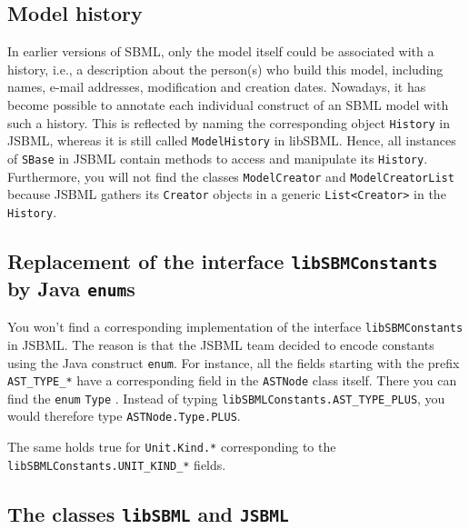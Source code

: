 \documentclass[
  BCOR12mm,
  letterpaper,
  11pt,
  headsepline,
  pointlessnumbers,
  tablecaptionabove,
  onelinecaption,
  headinclude,
  appendixprefix,
  idxtotoc,
  bibtotoc,
  twoside,
  titlepage
]{scrartcl}
\begin{document}
\subsection{Model history}

In earlier versions of SBML, only the model itself could be
associated with a history, i.e., a description about the person(s) who build
this model, including names, e-mail addresses, modification and creation dates.
Nowadays, it has become possible to annotate each individual construct of an
SBML model with such a history. This is reflected by naming the corresponding
object \texttt{History}
in JSBML, whereas it is still called
\texttt{ModelHistory} in libSBML. Hence,
all instances of \texttt{SBase} in JSBML
 contain methods to access and
manipulate its \texttt{History}. Furthermore, you will not find the classes
\texttt{ModelCreator} and \texttt{ModelCreatorList} because
JSBML
gathers its \texttt{Creator} objects
in a generic \texttt{List<Creator>} in the
\texttt{History}.


\subsection{Replacement of the interface \texttt{libSBMConstants} by Java \texttt{enum}s}

You won't find a corresponding implementation of the interface
\texttt{libSBMConstants} in JSBML. The reason is that the JSBML team decided to
encode constants 
using the Java construct \texttt{enum}. For instance, all the fields starting
with the prefix \texttt{AST\_TYPE\_*}
have a corresponding field in the \texttt{ASTNode} class itself. There you can
find the \texttt{enum} \texttt{Type}
.
Instead of typing \texttt{libSBMLConstants.AST\_TYPE\_PLUS}, you would therefore
type \texttt{ASTNode.Type.PLUS}.

The same holds true for \texttt{Unit.Kind.*} corresponding to the
\texttt{libSBMLConstants.UNIT\_KIND\_*}
fields.

\subsection{The classes \texttt{libSBML} and \texttt{JSBML}}
\end{document}
